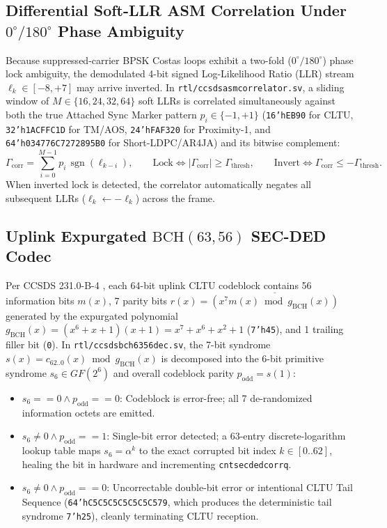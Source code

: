 \documentclass[10pt,a4paper]{article}
\renewcommand{\_}{\origunderscore\penalty0\hskip0pt\relax}
\numberwithin{equation}{section}
\numberwithin{table}{section}
\numberwithin{figure}{section}
\begin{document}
\subsection{Differential Soft-LLR ASM Correlation Under $0^\circ/180^\circ$ Phase Ambiguity}
Because suppressed-carrier BPSK Costas loops exhibit a two-fold ($0^\circ / 180^\circ$) phase lock ambiguity, the demodulated 4-bit signed Log-Likelihood Ratio (LLR) stream $\ell_k \in [-8, +7]$ may arrive inverted. In \texttt{rtl/ccsds\_asm\_correlator.sv}, a sliding window of $M \in \{16, 24, 32, 64\}$ soft LLRs is correlated simultaneously against both the true Attached Sync Marker pattern $p_i \in \{-1, +1\}$ (\texttt{16'hEB90} for CLTU, \texttt{32'h1ACFFC1D} for TM/AOS, \texttt{24'hFAF320} for Proximity-1, and \texttt{64'h034776C7272895B0} for Short-LDPC/AR4JA) and its bitwise complement:
\begin{equation}
  \Gamma_{\text{corr}} = \sum_{i=0}^{M-1} p_i\,\operatorname{sgn}(\ell_{k-i}), \qquad
  \text{Lock} \iff |\Gamma_{\text{corr}}| \ge \Gamma_{\text{thresh}}, \qquad
  \text{Invert} \iff \Gamma_{\text{corr}} \le -\Gamma_{\text{thresh}}.
\end{equation}
When inverted lock is detected, the correlator automatically negates all subsequent LLRs ($\ell_k \leftarrow -\ell_k$) across the frame.

\subsection{Uplink Expurgated $\text{BCH}(63,56)$ SEC-DED Codec}
Per CCSDS 231.0-B-4 \cite{ccsds231}, each 64-bit uplink CLTU codeblock contains 56 information bits $m(x)$, 7 parity bits $r(x) = \overline{(x^7 m(x) \bmod g_{\text{BCH}}(x))}$ generated by the expurgated polynomial $g_{\text{BCH}}(x) = (x^6 + x + 1)(x + 1) = x^7 + x^6 + x^2 + 1$ (\texttt{7'h45}), and 1 trailing filler bit (\texttt{0}). In \texttt{rtl/ccsds\_bch6356\_dec.sv}, the 7-bit syndrome $s(x) = c_{62..0}(x) \bmod g_{\text{BCH}}(x)$ is decomposed into the 6-bit primitive syndrome $s_6 \in GF(2^6)$ and overall codeblock parity $p_{\text{odd}} = s(1)$:
\begin{itemize}\setlength{\itemsep}{2pt}
  \item $s_6 == 0 \land p_{\text{odd}} == 0$: Codeblock is error-free; all 7 de-randomized information octets are emitted.
  \item $s_6 \ne 0 \land p_{\text{odd}} == 1$: Single-bit error detected; a 63-entry discrete-logarithm lookup table maps $s_6 = \alpha^k$ to the exact corrupted bit index $k \in [0..62]$, healing the bit in hardware and incrementing \texttt{cnt\_secded\_corr\_q}.
  \item $s_6 \ne 0 \land p_{\text{odd}} == 0$: Uncorrectable double-bit error or intentional CLTU Tail Sequence (\texttt{64'hC5C5\_C5C5\_C5C5\_C579}, which produces the deterministic tail syndrome \texttt{7'h25}), cleanly terminating CLTU reception.
\end{itemize}
\end{document}
